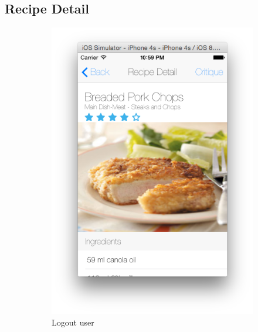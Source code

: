 \subsection{Recipe Detail} 
	  \begin{figure}[h]
	  	\begin{subfigure}{.32\textwidth}
	  		\includegraphics[width=.9\linewidth]{figures/ch4_app_screen_shots/recipe_detail/recipe_detail_1.png}
	  		\caption{Logout user}
	  	\end{subfigure}
	  	\begin{subfigure}{.32\textwidth}

\end{subfigure}
\end{figure}
